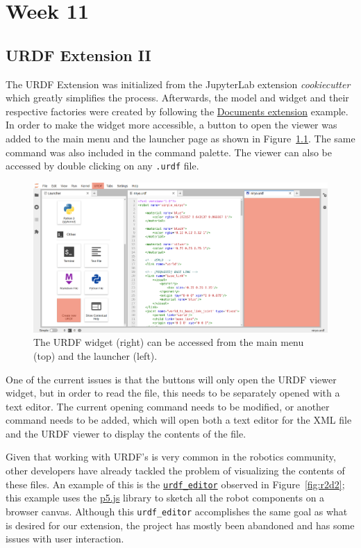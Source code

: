 \chapter{Week 11}

\section{URDF Extension II}

    The URDF Extension was initialized from the JupyterLab extension \textit{cookiecutter} which greatly simplifies the process. Afterwards, the model and widget and their respective factories were created by following the \href{https://github.com/jupyterlab/extension-examples/tree/master/documents}{Documents extension} example. In order to make the widget more accessible, a button to open the viewer was added to the main menu and the launcher page as shown in Figure~\ref{fig:startURDF}. The same command was also included in the command palette. The viewer can also be accessed by double clicking on any \texttt{.urdf} file.

    \begin{figure}[H]
        \centering
        \includegraphics[width=\linewidth]{Images/11_startURDF_red.png}
        \caption{The URDF widget (right) can be accessed from the main menu (top) and the launcher (left).}
        \label{fig:startURDF}
    \end{figure}

    \noindent One of the current issues is that the buttons will only open the URDF viewer widget, but in order to read the file, this needs to be separately opened with a text editor. The current opening command needs to be modified, or another command needs to be added, which will open both a text editor for the XML file and the URDF viewer to display the contents of the file.

    Given that working with URDF's is very common in the robotics community, other developers have already tackled the problem of visualizing the contents of these files. An example of this is the \href{https://github.com/danidask/urdf_editor}{\texttt{urdf\_editor}} observed in Figure~\ref{fig:r2d2}; this example uses the \href{https://p5js.org/}{p5.js} library to sketch all the robot components on a browser canvas. Although this \texttt{urdf\_editor} accomplishes the same goal as what is desired for our extension, the project has mostly been abandoned and has some issues with user interaction.

